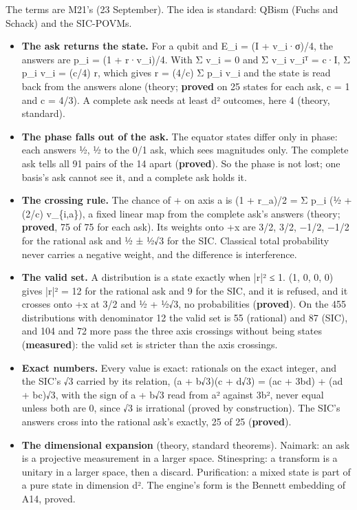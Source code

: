 The terms are M21's (23 September). The idea is standard: QBism (Fuchs and Schack) and the SIC-POVMs.

\begin{itemize}
\item \textbf{The ask returns the state.} For a qubit and E\_\allowbreak{}i = (I + v\_\allowbreak{}i·σ)/4, the answers are p\_\allowbreak{}i = (1 + r·v\_\allowbreak{}i)/4. With Σ v\_\allowbreak{}i = 0 and Σ v\_\allowbreak{}i v\_\allowbreak{}iᵀ = c·I, Σ p\_\allowbreak{}i v\_\allowbreak{}i = (c/4) r, which gives r = (4/c) Σ p\_\allowbreak{}i v\_\allowbreak{}i and the state is read back from the answers alone (theory; \textbf{proved} on 25 states for each ask, c = 1 and c = 4/3). A complete ask needs at least d² outcomes, here 4 (theory, standard).
\item \textbf{The phase falls out of the ask.} The equator states differ only in phase: each answers ½, ½ to the 0/1 ask, which sees magnitudes only. The complete ask tells all 91 pairs of the 14 apart (\textbf{proved}). So the phase is not lost; one basis's ask cannot see it, and a complete ask holds it.
\item \textbf{The crossing rule.} The chance of + on axis a is (1 + r\_\allowbreak{}a)/2 = Σ p\_\allowbreak{}i (½ + (2/c) v\_\allowbreak{}\{i,a\}), a fixed linear map from the complete ask's answers (theory; \textbf{proved}, 75 of 75 for each ask). Its weights onto +x are 3/2, 3/2, −1/2, −1/2 for the rational ask and ½ ± ½√3 for the SIC. Classical total probability never carries a negative weight, and the difference is interference.
\item \textbf{The valid set.} A distribution is a state exactly when |r|² ≤ 1. (1, 0, 0, 0) gives |r|² = 12 for the rational ask and 9 for the SIC, and it is refused, and it crosses onto +x at 3/2 and ½ + ½√3, no probabilities (\textbf{proved}). On the 455 distributions with denominator 12 the valid set is 55 (rational) and 87 (SIC), and 104 and 72 more pass the three axis crossings without being states (\textbf{measured}): the valid set is stricter than the axis crossings.
\item \textbf{Exact numbers.} Every value is exact: rationals on the exact integer, and the SIC's √3 carried by its relation, (a + b√3)(c + d√3) = (ac + 3bd) + (ad + bc)√3, with the sign of a + b√3 read from a² against 3b², never equal unless both are 0, since √3 is irrational (proved by construction). The SIC's answers cross into the rational ask's exactly, 25 of 25 (\textbf{proved}).
\item \textbf{The dimensional expansion} (theory, standard theorems). Naimark: an ask is a projective measurement in a larger space. Stinespring: a transform is a unitary in a larger space, then a discard. Purification: a mixed state is part of a pure state in dimension d². The engine's form is the Bennett embedding of A14, proved.

\end{itemize}
